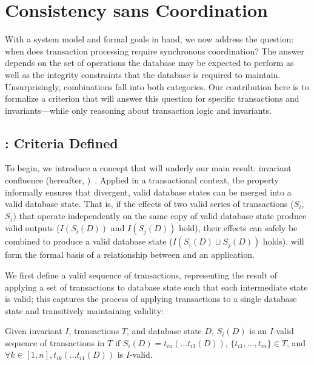 
\section{Consistency sans Coordination}
\label{sec:bcc-theory}

With a system model and formal goals in hand, we now address the
question: when does transaction processing require synchronous
coordination? The answer depends on the set of operations the database
may be expected to perform as well as the integrity constraints that
the database is required to maintain. Unsurprisingly, combinations
fall into both categories. Our contribution here is to formalize a
criterion that will answer this question for specific transactions and
invariants---while only reasoning about transaction logic and
invariants.

\subsection{\iconfluence: Criteria Defined}

To begin, we introduce a concept that will underly our main result:
invariant confluence (hereafter,
\iconfluence)~\cite{obs-confluence}. Applied in a transactional
context, the \iconfluence property informally ensures that divergent,
valid database states can be merged into a valid database state. That
is, if the effects of two valid series of transactions ($S_i$, $S_j$)
that operate independently on the same copy of valid database state
produce valid outputs ($I(S_i(D))$ and $I(S_j(D))$ hold), their
effects can safely be combined to produce a valid database state
($I(S_i(D) \sqcup S_j(D))$ holds). \iconfluence will form the formal
basis of a relationship between \cfreedom and an application.

We first define a valid sequence of transactions, representing the
result of applying a set of transactions to database state such that
each intermediate state is valid; this captures the process of
applying transactions to a single database state and transitively
maintaining validity:

\begin{definition}
Given invariant $I$, transactions $T$, and database state $D$,
$S_i(D)$ is an $I$-valid sequence of transactions in $T$ if $S_i(D) =
t_{in}(\dots t_{i1}(D))$, $\{t_{i1}, \dots, t_{in}\} \in T$, and
$\forall k \in [1, n], t_{ik}(\dots t_{i1}(D))$ is $I$-valid.
\end{definition}

